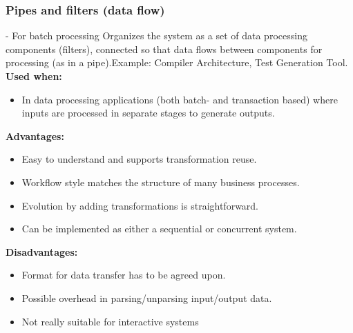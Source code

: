 \documentclass[../ESOF_notes.tex]{subfiles}
\begin{document}
\subsubsection{Pipes and filters (data flow)} - For batch processing\newline\newline
Organizes the system as a set of data processing components (filters), connected so that data flows between components for processing (as in a pipe).\newline Example: Compiler Architecture, Test Generation Tool.\newline\newline
\textbf{Used when:}
\begin{itemize}
    \item In data processing applications (both batch- and transaction based) where inputs are processed in separate stages to generate outputs.
\end{itemize}
\textbf{Advantages:}
\begin{itemize}
    \item Easy to understand and supports transformation reuse.
    \item Workflow style matches the structure of many business processes.
    \item Evolution by adding transformations is straightforward.
    \item Can be implemented as either a sequential or concurrent system.
\end{itemize}
\textbf{Disadvantages:}
\begin{itemize}
    \item Format for data transfer has to be agreed upon.
    \item Possible overhead in parsing/unparsing input/output data.
    \item Not really suitable for interactive systems
\end{itemize}
\end{document}
